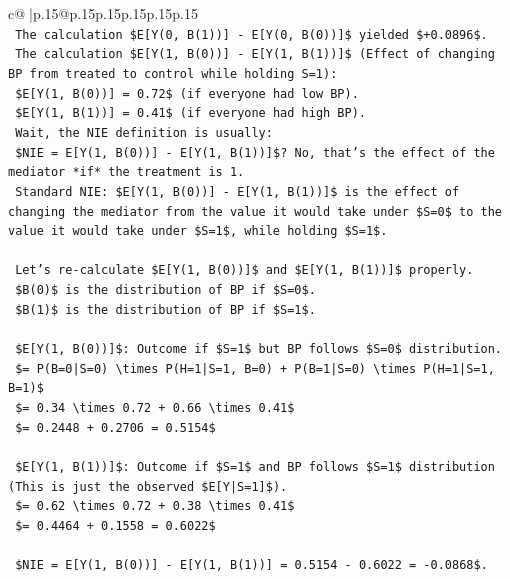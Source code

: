 \documentclass{article}
\begin{document}
{\begin{supertabular}{c@{$\;$}|p{.15\linewidth}@{}p{.15\linewidth}p{.15\linewidth}p{.15\linewidth}p{.15\linewidth}p{.15\linewidth}}
{{{\\ 
\texttt{    The calculation \$E{[}Y(0, B(1)){]} {-} E{[}Y(0, B(0)){]}\$ yielded \$+0.0896\$.} \\
\texttt{    The calculation \$E{[}Y(1, B(0)){]} {-} E{[}Y(1, B(1)){]}\$ (Effect of changing BP from treated to control while holding S=1):} \\
\texttt{    \$E{[}Y(1, B(0)){]} = 0.72\$ (if everyone had low BP).} \\
\texttt{    \$E{[}Y(1, B(1)){]} = 0.41\$ (if everyone had high BP).} \\
\texttt{    Wait, the NIE definition is usually:} \\
\texttt{    \$NIE = E{[}Y(1, B(0)){]} {-} E{[}Y(1, B(1)){]}\$? No, that's the effect of the mediator *if* the treatment is 1.} \\
\texttt{    Standard NIE: \$E{[}Y(1, B(0)){]} {-} E{[}Y(1, B(1)){]}\$ is the effect of changing the mediator from the value it would take under \$S=0\$ to the value it would take under \$S=1\$, while holding \$S=1\$.} \\
\\ 
\texttt{    Let's re{-}calculate \$E{[}Y(1, B(0)){]}\$ and \$E{[}Y(1, B(1)){]}\$ properly.} \\
\texttt{    \$B(0)\$ is the distribution of BP if \$S=0\$.} \\
\texttt{    \$B(1)\$ is the distribution of BP if \$S=1\$.} \\
\\ 
\texttt{    \$E{[}Y(1, B(0)){]}\$: Outcome if \$S=1\$ but BP follows \$S=0\$ distribution.} \\
\texttt{    \$= P(B=0|S=0) \textbackslash{}times P(H=1|S=1, B=0) + P(B=1|S=0) \textbackslash{}times P(H=1|S=1, B=1)\$} \\
\texttt{    \$= 0.34 \textbackslash{}times 0.72 + 0.66 \textbackslash{}times 0.41\$} \\
\texttt{    \$= 0.2448 + 0.2706 = 0.5154\$} \\
\\ 
\texttt{    \$E{[}Y(1, B(1)){]}\$: Outcome if \$S=1\$ and BP follows \$S=1\$ distribution (This is just the observed \$E{[}Y|S=1{]}\$).} \\
\texttt{    \$= 0.62 \textbackslash{}times 0.72 + 0.38 \textbackslash{}times 0.41\$} \\
\texttt{    \$= 0.4464 + 0.1558 = 0.6022\$} \\
\\ 
\texttt{    \$NIE = E{[}Y(1, B(0)){]} {-} E{[}Y(1, B(1)){]} = 0.5154 {-} 0.6022 = {-}0.0868\$.} \\
}}}
\end{supertabular}}
\end{document}
